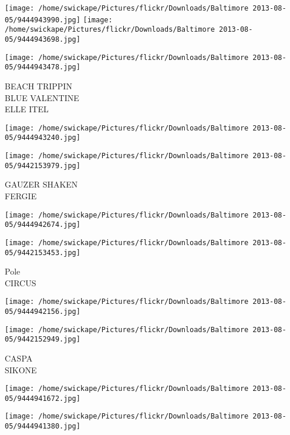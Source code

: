 \documentclass[10pt,letterpaper]{article}
\begin{document}
\texttt{[image: /home/swickape/Pictures/flickr/Downloads/Baltimore 2013-08-05/9444943990.jpg]}
\texttt{[image: /home/swickape/Pictures/flickr/Downloads/Baltimore 2013-08-05/9444943698.jpg]}

\vspace{0.25in}
\texttt{[image: /home/swickape/Pictures/flickr/Downloads/Baltimore 2013-08-05/9444943478.jpg]}

BEACH TRIPPIN\\
BLUE VALENTINE\\
ELLE ITEL\\
\pagebreak

\texttt{[image: /home/swickape/Pictures/flickr/Downloads/Baltimore 2013-08-05/9444943240.jpg]}

\vspace{0.25in}
\texttt{[image: /home/swickape/Pictures/flickr/Downloads/Baltimore 2013-08-05/9442153979.jpg]}

GAUZER SHAKEN\\
FERGIE\\
\pagebreak

\texttt{[image: /home/swickape/Pictures/flickr/Downloads/Baltimore 2013-08-05/9444942674.jpg]}

\vspace{0.25in}
\texttt{[image: /home/swickape/Pictures/flickr/Downloads/Baltimore 2013-08-05/9442153453.jpg]}

Pole\\
CIRCUS\\
\pagebreak

\texttt{[image: /home/swickape/Pictures/flickr/Downloads/Baltimore 2013-08-05/9444942156.jpg]}

\vspace{0.25in}
\texttt{[image: /home/swickape/Pictures/flickr/Downloads/Baltimore 2013-08-05/9442152949.jpg]}

CASPA\\
SIKONE\\
\pagebreak

\texttt{[image: /home/swickape/Pictures/flickr/Downloads/Baltimore 2013-08-05/9444941672.jpg]}

\vspace{0.25in}
\texttt{[image: /home/swickape/Pictures/flickr/Downloads/Baltimore 2013-08-05/9444941380.jpg]}
\end{document}
